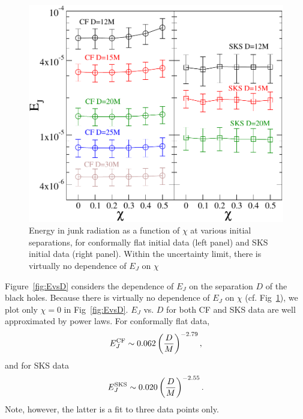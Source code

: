 \begin{figure}
\includegraphics[width=0.95\columnwidth]{chap5/EvsS}
  \caption[$E_J$ as a function of $\chi$.]{Energy in junk radiation as a function of $\chi$ at various
  initial separations, for conformally flat initial data (left panel)
  and SKS initial data (right panel). Within the uncertainty limit,
  there is virtually no dependence of $E_J$ on $\chi$ }
  \label{fig:EvsS}
\end{figure}

Figure~\ref{fig:EvsD} considers the dependence of $E_J$ on the separation $D$ of the black holes. Because there is virtually
no dependence of $E_J$ on $\chi$ (cf. Fig~\ref{fig:EvsS}), we plot only $\chi=0$ in Fig~\ref{fig:EvsD}. $E_J$ vs. $D$ for both CF and SKS data are well approximated by power laws. For
conformally flat data,
\begin{equation}
E_J^{\rm CF}\sim0.062\left(\frac{D}{M}\right)^{-2.79},
\end{equation}
and for SKS data
\begin{equation}
E_J^{\rm SKS}\sim 0.020\left(\frac{D}{M}\right)^{-2.55}.
\end{equation}
Note, however, the latter is a fit to three data points only.





